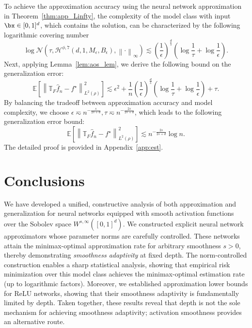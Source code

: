 \documentclass[11pt]{article}
\begin{document}
To achieve the approximation accuracy using the neural network approximation in Theorem~\ref{thm:app_Linfty}, the complexity of the model class with input $\bx \in [0,1]^d$, which contains the solution, can be characterized by the following logarithmic covering number 
\begin{equation}
    \log \mathcal{N} \left(\tau, \mathcal{H}^{\phi,7}(d, 1, M_{\epsilon}, B_{\epsilon}), \left\|\cdot\right\|_\infty \right) \lesssim \left( \frac{1}{\epsilon}\right)^{\frac{d}{s}} \left(\log \frac{1}{\tau} + \log \frac{1}{\epsilon} \right).
    \label{eq:est_sketch_log_covering}
\end{equation}
Next, applying Lemma~\ref{lem:aos_lem}, we derive the following bound on the generalization error: 
\begin{equation*}
    \mathbb{E} \left[ \left\| \mathbb{T}_{F} \widehat{f}_n - f^\star\right\|_{L^2(\rho)}^2  
    \right] \lesssim  \epsilon^2 + \frac{1}{n} \left( \frac{1}{\epsilon}\right)^{\frac{d}{s}}  \left( \log  \frac{1}{\tau} + \log \frac{1}{\epsilon}\right)+ \tau.
\end{equation*}
By balancing the tradeoff between approximation accuracy and model complexity, we choose $\epsilon \eqsim n^{-\frac{s}{2s+d}}, \tau \eqsim n^{-\frac{2s}{2s+d}}$, which leads to the following generalization error bound: 
\begin{equation*}
     \mathbb{E} \left[ \left\| \mathbb{T}_{F} \widehat{f}_n - f^\star\right\|_{L^2(\rho)}^2  
    \right] \lesssim n^{-\frac{2s}{2s+d}} \log n.
\end{equation*}
The detailed proof is provided in Appendix~\ref{app:est}.

\section{Conclusions}

We have developed a unified, constructive analysis of both approximation and generalization for  neural networks equipped with smooth activation functions over the Sobolev space $W^{s,\infty}([0,1]^d)$. 
We constructed explicit neural network approximators whose parameter norms are carefully controlled. 
These networks attain the minimax-optimal approximation rate for arbitrary smoothness $s>0$, thereby demonstrating \emph{smoothness adaptivity} at fixed depth. 
The norm-controlled construction enables a sharp statistical analysis, showing that empirical risk minimization over this model class achieves the minimax-optimal estimation rate (up to logarithmic factors).
Moreover, we established approximation lower bounds for ReLU networks, showing that their smoothness adaptivity is fundamentally limited by depth.
Taken together, these results reveal that depth is not the sole mechanism for achieving smoothness adaptivity; activation smoothness provides an alternative route.
\end{document}
